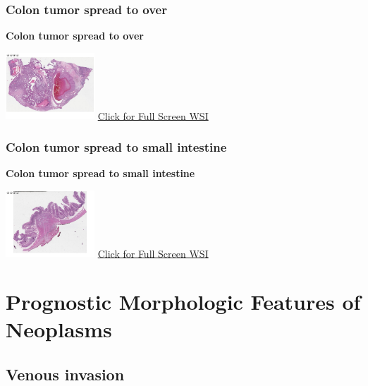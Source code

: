 \documentclass[
  letterpaper,
  paper=6in:9in,
  pagesize=pdftex,
  headinclude=on,
  footinclude=on,
  12pt]{scrbook}
\begin{document}
\hypertarget{sec-colon-tumor-spread-to-over}{%
\section{Colon tumor spread to
over}\label{sec-colon-tumor-spread-to-over}}

\textbf{Colon tumor spread to over}

\href{https://images.patolojiatlasi.com/tumor-spread/HE-over.html}{\includegraphics[width=0.25\textwidth,height=\textheight]{./screenshots/tumor-spread-over_screenshot.png}}
\href{https://images.patolojiatlasi.com/tumor-spread/HE-over.html}{Click
for Full Screen WSI}

\hypertarget{sec-colon-tumor-spread-to-small-intestine}{%
\section{Colon tumor spread to small
intestine}\label{sec-colon-tumor-spread-to-small-intestine}}

\textbf{Colon tumor spread to small intestine}

\href{https://images.patolojiatlasi.com/tumor-spread/HE-small-intestine.html}{\includegraphics[width=0.25\textwidth,height=\textheight]{./screenshots/tumor-spread-small-intestine_screenshot.png}}
\href{https://images.patolojiatlasi.com/tumor-spread/HE-small-intestine.html}{Click
for Full Screen WSI}

\part{Prognostic Morphologic Features of Neoplasms}

\hypertarget{sec-venous-invasion}{%
\chapter{Venous invasion}\label{sec-venous-invasion}}
\end{document}
